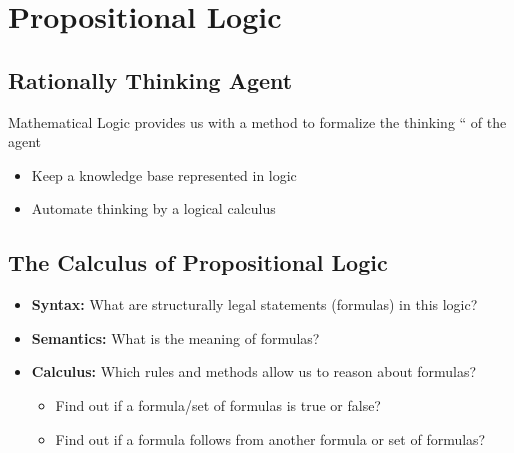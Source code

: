 \documentclass[conference]{styles/acmsiggraph}
\begin{document}
    
    
    
    
    
    
    
    
    
\section{Propositional Logic}

    \subsection{Rationally Thinking Agent}
        Mathematical Logic provides us with a method to formalize the thinking “ of the agent
        \begin{itemize}
            \item Keep a knowledge base represented in logic
            \item Automate thinking by a logical calculus
        \end{itemize}
    
    
    \subsection{The Calculus of Propositional Logic}
        \begin{itemize}
            \item \textbf{Syntax:} What are structurally legal statements (formulas) in this logic?
            \item \textbf{Semantics:} What is the meaning of formulas?
            \item \textbf{Calculus:} Which rules and methods allow us to reason about formulas?
                \begin{itemize}
                    \item Find out if a formula/set of formulas is true or false?
                    \item Find out if a formula follows from another formula or set of formulas?
                \end{itemize}
        \end{itemize}
    
    
\end{document}
